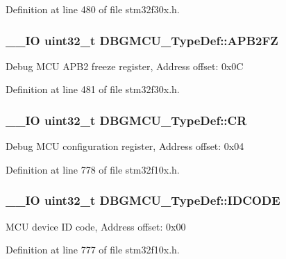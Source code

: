 Definition at line 480 of file stm32f30x.\-h.

\hypertarget{struct_d_b_g_m_c_u___type_def_a011f892d86367dbe786964b14bc515a6}{
\subsubsection[{A\-P\-B2\-F\-Z}]{\setlength{\rightskip}{0pt plus 5cm}\-\_\-\-\_\-\-I\-O {\bf uint32\-\_\-t} D\-B\-G\-M\-C\-U\-\_\-\-Type\-Def\-::\-A\-P\-B2\-F\-Z}}\label{struct_d_b_g_m_c_u___type_def_a011f892d86367dbe786964b14bc515a6}
Debug M\-C\-U A\-P\-B2 freeze register, Address offset\-: 0x0\-C 

Definition at line 481 of file stm32f30x.\-h.

\hypertarget{struct_d_b_g_m_c_u___type_def_a15981828f2b915d38570cf6684e99a53}{
\subsubsection[{C\-R}]{\setlength{\rightskip}{0pt plus 5cm}\-\_\-\-\_\-\-I\-O {\bf uint32\-\_\-t} D\-B\-G\-M\-C\-U\-\_\-\-Type\-Def\-::\-C\-R}}\label{struct_d_b_g_m_c_u___type_def_a15981828f2b915d38570cf6684e99a53}
Debug M\-C\-U configuration register, Address offset\-: 0x04 

Definition at line 778 of file stm32f10x.\-h.

\hypertarget{struct_d_b_g_m_c_u___type_def_a0cc3561c124d06bb57dfa855e43ed99f}{
\subsubsection[{I\-D\-C\-O\-D\-E}]{\setlength{\rightskip}{0pt plus 5cm}\-\_\-\-\_\-\-I\-O {\bf uint32\-\_\-t} D\-B\-G\-M\-C\-U\-\_\-\-Type\-Def\-::\-I\-D\-C\-O\-D\-E}}\label{struct_d_b_g_m_c_u___type_def_a0cc3561c124d06bb57dfa855e43ed99f}
M\-C\-U device I\-D code, Address offset\-: 0x00 

Definition at line 777 of file stm32f10x.\-h.



